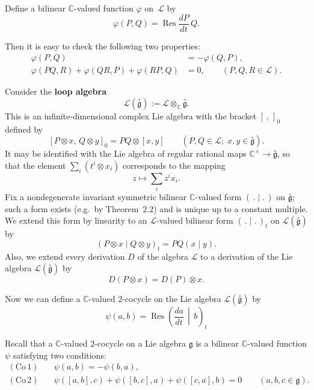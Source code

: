 \documentclass[12pt]{article}
\begin{document}
Define a bilinear $\mathbb{C}$-valued function $\varphi$ on~$\mathcal{L}$ by
\[
    \varphi(P,Q) = \operatorname{Res} \frac{dP}{dt} \, Q.
\]

Then it is easy to check the following two properties:
\begin{align}
    \varphi(P,Q)                                  & = -\varphi(Q,P), \tag{7.1.1} \\[4pt]
    \varphi(PQ,R) + \varphi(QR,P) + \varphi(RP,Q) & = 0,
    \qquad (P,Q,R \in \mathcal{L}). \tag{7.1.2}
\end{align}

Consider the \textbf{loop algebra}
\[
    \mathcal{L}(\overset{\circ}{\mathfrak{g}}) := \mathcal{L} \otimes_{\mathbb{C}} \overset{\circ}{\mathfrak{g}}.
\]
This is an infinite-dimensional complex Lie algebra with the bracket $[\, ,\, ]_0$ defined by
\[
    [P \otimes x,\, Q \otimes y]_0 = PQ \otimes [x,y] \qquad (P,Q \in \mathcal{L};\; x,y \in \overset{\circ}{\mathfrak{g}}).
\]
It may be identified with the Lie algebra of regular rational maps $\mathbb{C}^\times \to \overset{\circ}{\mathfrak{g}}$, so that the element $\sum_i (t^i \otimes x_i)$ corresponds to the mapping
\[
    z \longmapsto \sum_i z^i x_i.
\]
Fix a nondegenerate invariant symmetric bilinear $\mathbb{C}$-valued form $(\,.\mid.\,)$ on $\overset{\circ}{\mathfrak{g}}$; such a form exists (e.g.\ by Theorem~2.2) and is unique up to a constant multiple.
We extend this form by linearity to an $\mathcal{L}$-valued bilinear form $(\,.\mid.\,)_t$ on $\mathcal{L}(\overset{\circ}{\mathfrak{g}})$ by
\[
    (P \otimes x \mid Q \otimes y)_t = PQ (x \mid y).
\]
Also, we extend every derivation $D$ of the algebra $\mathcal{L}$ to a derivation of the Lie algebra $\mathcal{L}(\overset{\circ}{\mathfrak{g}})$ by
\[
    D(P \otimes x) = D(P) \otimes x.
\]

Now we can define a $\mathbb{C}$-valued $2$-cocycle on the Lie algebra $\mathcal{L}(\overset{\circ}{\mathfrak{g}})$ by
\[
    \psi(a,b) = \operatorname{Res} \left( \frac{da}{dt} \,\middle|\, b \right)_t
\]

Recall that a $\mathbb{C}$-valued $2$-cocycle on a Lie algebra $\mathfrak{g}$ is a bilinear $\mathbb{C}$-valued function $\psi$ satisfying two conditions:
\begin{align*}
    (\mathrm{Co}\,1) \quad & \psi(a,b) = -\psi(b,a),                           \\[2pt]
    (\mathrm{Co}\,2) \quad & \psi([a,b],c) + \psi([b,c],a) + \psi([c,a],b) = 0
    \qquad (a,b,c \in \mathfrak{g}).
\end{align*}
\end{document}
